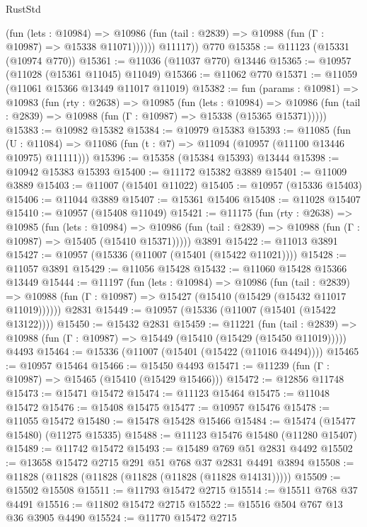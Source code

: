 \begin{lexlean}{RustStd}
\begin{coremodule}
              (fun (lets : @10984) =>
              @10986 (fun (tail : @2839) => @10988 (fun (Γ : @10987) => @15338 @11071))))))
        @11117))
    @770
@15358 := @11123 (@15331 (@10974 @770))
@15361 := @11036 (@11037 @770) @13446
@15365 := @10957 (@11028 (@15361 @11045) @11049)
@15366 := @11062 @770
@15371 := @11059 (@11061 @15366 @13449 @11017 @11019)
@15382 := fun (params : @10981) =>
  @10983
    (fun (rty : @2638) =>
    @10985
      (fun (lets : @10984) =>
      @10986 (fun (tail : @2839) => @10988 (fun (Γ : @10987) => @15338 (@15365 @15371)))))
@15383 := @10982 @15382
@15384 := @10979 @15383
@15393 := @11085
    (fun (U : @11084) => @11086 (fun (t : @7) => @11094 (@10957 (@11100 @13446 @10975) @11111)))
@15396 := @15358 (@15384 @15393) @13444
@15398 := @10942 @15383 @15393
@15400 := @11172 @15382 @3889
@15401 := @11009 @3889
@15403 := @11007 (@15401 @11022)
@15405 := @10957 (@15336 @15403)
@15406 := @11044 @3889
@15407 := @15361 @15406
@15408 := @11028 @15407
@15410 := @10957 (@15408 @11049)
@15421 := @11175
    (fun (rty : @2638) =>
    @10985
      (fun (lets : @10984) =>
      @10986 (fun (tail : @2839) => @10988 (fun (Γ : @10987) => @15405 (@15410 @15371)))))
    @3891
@15422 := @11013 @3891
@15427 := @10957 (@15336 (@11007 (@15401 (@15422 @11021))))
@15428 := @11057 @3891
@15429 := @11056 @15428
@15432 := @11060 @15428 @15366 @13449
@15444 := @11197
    (fun (lets : @10984) =>
    @10986
      (fun (tail : @2839) =>
      @10988 (fun (Γ : @10987) => @15427 (@15410 (@15429 (@15432 @11017 @11019))))))
    @2831
@15449 := @10957 (@15336 (@11007 (@15401 (@15422 @13122))))
@15450 := @15432 @2831
@15459 := @11221
    (fun (tail : @2839) => @10988 (fun (Γ : @10987) => @15449 (@15410 (@15429 (@15450 @11019)))))
    @4493
@15464 := @15336 (@11007 (@15401 (@15422 (@11016 @4494))))
@15465 := @10957 @15464
@15466 := @15450 @4493
@15471 := @11239 (fun (Γ : @10987) => @15465 (@15410 (@15429 @15466)))
@15472 := @12856 @11748
@15473 := @15471 @15472
@15474 := @11123 @15464
@15475 := @11048 @15472
@15476 := @15408 @15475
@15477 := @10957 @15476
@15478 := @11055 @15472
@15480 := @15478 @15428 @15466
@15484 := @15474 (@15477 @15480) (@11275 @15335)
@15488 := @11123 @15476 @15480 (@11280 @15407)
@15489 := @11742 @15472
@15493 := @15489 @769 @51 @2831 @4492
@15502 := @13658 @15472 @2715 @291 @51 @768 @37 @2831 @4491 @3894
@15508 := @11828 (@11828 (@11828 (@11828 (@11828 (@11828 @14131)))))
@15509 := @15502 @15508
@15511 := @11793 @15472 @2715
@15514 := @15511 @768 @37 @4491
@15516 := @11802 @15472 @2715
@15522 := @15516 @504 @767 @13 @36 @3905 @4490
@15524 := @11770 @15472 @2715

\end{coremodule}
\end{lexlean}
